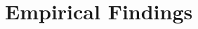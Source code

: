 \documentclass[10pt,handout]{beamer}
\begin{document}
%
%
%






\section{Empirical Findings}


\end{document}
